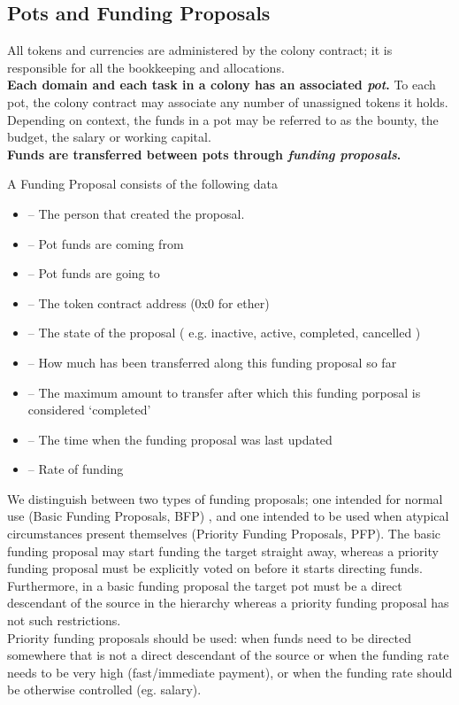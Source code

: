 \subsection{Pots and Funding Proposals}\label{sec:pots-and-fp}
All tokens and currencies are administered by the colony contract; it is responsible for all the bookkeeping and allocations.\\
\textbf{Each domain and each task in a colony has an associated \emph{pot}.} To each pot, the colony contract may associate any number of unassigned tokens it holds. Depending on context, the funds in a pot may be referred to as the bounty, the budget, the salary or working capital.\\
\textbf{Funds are transferred between pots through \emph{funding proposals}.}
\begin{description}
 \item A Funding Proposal consists of the following data
 \begin{itemize}
  \item {}	--	The person that created the proposal.
  \item {}	--	Pot funds are coming from
  \item {}	--	Pot funds are going to
  \item {}	--	The token contract address (0x0 for ether)
  \item {}	--	The state of the proposal ( e.g. inactive, active, completed, cancelled )
  \item {}	--	How much has been transferred along this funding proposal so far
  \item {}	--	The maximum amount to transfer after which this funding porposal is considered `completed'
  \item {}	--	The time when the funding proposal was last updated
  \item {}	--	Rate of funding
 \end{itemize}

\end{description}
We distinguish between two types of funding proposals; one intended for normal use (Basic Funding Proposals, BFP) , and one intended to be used when atypical circumstances present themselves (Priority Funding Proposals, PFP). The basic funding proposal may start funding the target straight away, whereas a priority funding proposal must be explicitly voted on before it starts directing funds. Furthermore, in a basic funding proposal the target pot must be a direct descendant of the source in the hierarchy whereas a priority funding proposal has not such restrictions.\\
Priority funding proposals should be used: when funds need to be directed somewhere that is not a direct descendant of the source or when the funding rate needs to be very high (fast/immediate payment), or when the funding rate should be otherwise controlled (eg. salary).\\

